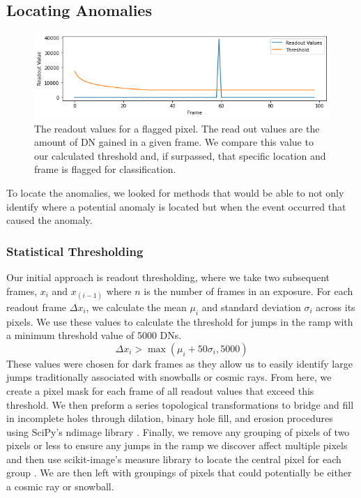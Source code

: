 \subsection{Locating Anomalies}
\begin{figure}[b]
    \centering
    \includegraphics[width=1\linewidth]{figs/rst/Threshold.png}
    \caption[Readout Values Throughout a WFI Detector's Integration]{The readout values for a flagged pixel. The read out values are the amount of DN gained in a given frame. We compare this value to our calculated threshold and, if surpassed, that specific location and frame is flagged for classification.}
    \label{rst/fig:threshold}
\end{figure}
To locate the anomalies, we looked for methods that would be able to not only identify where a potential anomaly is located but when the event occurred that caused the anomaly. 
\subsubsection{Statistical Thresholding}
Our initial approach is readout thresholding, where we take two subsequent frames, $x_i$ and $x_{(i-1)}$ where $n$ is the number of frames in an exposure. 
For each readout frame $\Delta x_i$, we calculate the mean $\mu_i$ and standard deviation $\sigma_i$ across its pixels. 
We use these values to calculate the threshold for jumps in the ramp with a minimum threshold value of 5000 DNs.
\begin{equation}
    \Delta x_i > \max(\mu_i + 50 \sigma_i, 5000)
\end{equation}
These values were chosen for dark frames as they allow us to easily identify large jumps traditionally associated with snowballs or cosmic rays. 
From here, we create a pixel mask for each frame of all readout values that exceed this threshold. 
We then preform a series topological transformations to bridge and fill in incomplete holes through dilation, binary hole fill, and erosion procedures using SciPy's ndimage library \parencite{2020SciPy-NMeth}.
Finally, we remove any grouping of pixels of two pixels or less to ensure any jumps in the ramp we discover affect multiple pixels and then use scikit-image's measure library to locate the central pixel for each group \parencite{scikit-image}.
We are then left  with groupings of pixels that could potentially be either a cosmic ray or snowball.


